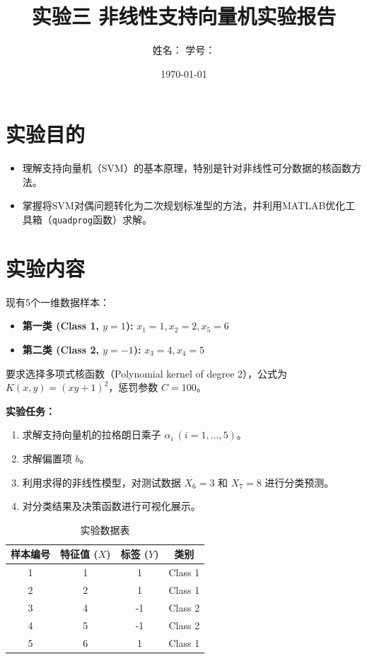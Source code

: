 \documentclass[11pt, a4paper]{article}
\title{\textbf{实验三 \quad 非线性支持向量机实验报告}}
\author{姓名：\underline{\makebox[3cm]{林鑫}} \quad 学号：\underline{\makebox[3cm]{1043220122}}}
\date{\today}
\begin{document}
	
	\maketitle
	
	\section{实验目的}
	\begin{itemize}
		\item 理解支持向量机（SVM）的基本原理，特别是针对非线性可分数据的核函数方法。
		\item 掌握将SVM对偶问题转化为二次规划标准型的方法，并利用MATLAB优化工具箱（\texttt{quadprog}函数）求解。
	\end{itemize}
	
	\section{实验内容}
	现有5个一维数据样本：
	\begin{itemize}
		\item \textbf{第一类 (Class 1, $y=1$):} $x_1=1, x_2=2, x_5=6$
		\item \textbf{第二类 (Class 2, $y=-1$):} $x_3=4, x_4=5$
	\end{itemize}
	
	要求选择多项式核函数（Polynomial kernel of degree 2），公式为 $K(x,y) = (xy + 1)^2$，惩罚参数 $C=100$。
	
	\textbf{实验任务：}
	\begin{enumerate}
		\item 求解支持向量机的拉格朗日乘子 $\alpha_i \ (i=1,\dots,5)$。
		\item 求解偏置项 $b$。
		\item 利用求得的非线性模型，对测试数据 $X_6=3$ 和 $X_7=8$ 进行分类预测。
		\item 对分类结果及决策函数进行可视化展示。
	\end{enumerate}
	
	\begin{table}[htbp]
		\centering
		\caption{实验数据表}
		\begin{tabular}{cccc}
			\toprule
			样本编号 & 特征值 ($X$) & 标签 ($Y$) & 类别 \\
			\midrule
			1 & 1 & 1 & Class 1 \\
			2 & 2 & 1 & Class 1 \\
			3 & 4 & -1 & Class 2 \\
			4 & 5 & -1 & Class 2 \\
			5 & 6 & 1 & Class 1 \\
			\bottomrule
		\end{tabular}
	\end{table}
	
\end{document}
